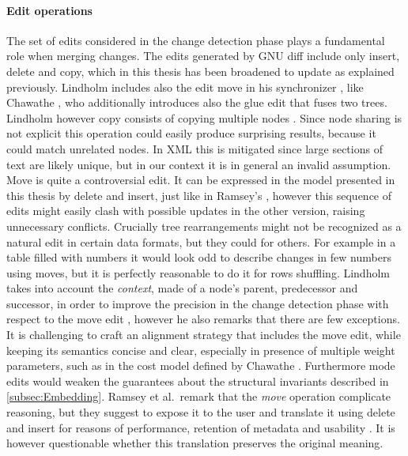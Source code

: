 \documentclass[../Thesis.tex]{subfiles}
\begin{document}
	\paragraph{Edit operations}
	The set of edits considered in the change detection phase plays
	a fundamental role when merging changes.
	The edits generated by GNU diff include only insert, delete and copy, 
	which in this thesis has been broadened to update as explained previously.
	Lindholm includes also the edit move in his synchronizer \cite{Lind04}, 
	like Chawathe \cite{Chawathe96, Chawathe97}, 
	who additionally introduces also the glue edit that fuses two trees.
	Lindholm however copy consists of copying multiple nodes \cite{Lind04}.
	Since node sharing is not explicit this operation could easily produce 
	surprising results, because it could match unrelated nodes. In XML
	this is mitigated since large sections of text are likely unique, but
	in our context it is in general an invalid assumption.
	Move is quite a controversial edit.
	It can be expressed in the model presented in this thesis by delete 
	and insert, just like in Ramsey's \cite{Ramsey01}, however this sequence 
	of edits might easily clash with possible updates in the other version,
	raising unnecessary conflicts.
	Crucially tree rearrangements	might not be recognized as a natural
	edit in certain data formats, but they could for others. 
	For example in a table filled with numbers it would look odd to describe
	changes in few numbers using moves, but it is perfectly reasonable
	to do it for rows shuffling. 
	Lindholm takes into account the \emph{context}, made of a node's parent, 
	predecessor	and successor, in order to improve the precision
	in the change detection phase with respect to the move edit \cite{Lind04},
	however he also remarks that there are few exceptions.
	It is challenging to craft an alignment strategy that includes the move edit,
	while keeping its semantics concise and clear, especially in presence
	of multiple weight parameters, such as in the cost model 
	defined by Chawathe \cite{Chawathe97}.
	Furthermore mode edits would weaken the guarantees about the
	structural invariants described in \ref{subsec:Embedding}.
	Ramsey et al.\ remark that the \emph{move} operation 
	complicate reasoning, but they suggest to expose it to the user and 
	translate it using delete and insert for reasons of performance, retention of 
	metadata 	and usability \cite{Ramsey01}.
	It is however questionable whether this translation preserves the original 
	meaning.	
	
\end{document}
